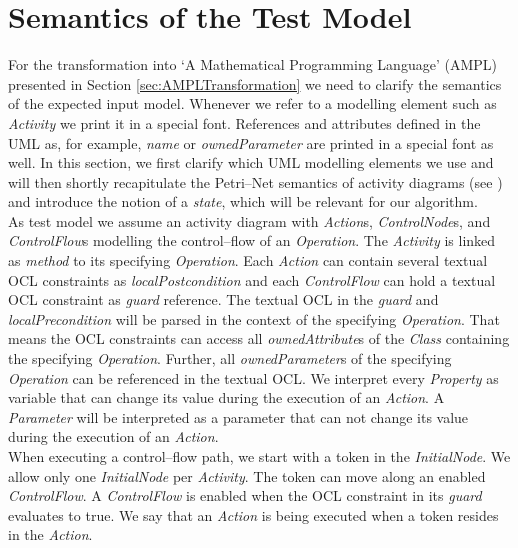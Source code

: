 \documentclass[runningheads,a4paper]{llncs}%
\newcommand{\UMLType}[1]{\textsf{\textit{#1}}} %
\newcommand{\UMLReference}[1]{\textsf{\textit{#1}}} %
\begin{document}
\section{Semantics of the Test Model}%
\label{sec:TestModel}%
For the transformation into `A Mathematical Programming Language' (AMPL) presented in Section \ref{sec:AMPLTransformation} we need to clarify the semantics of the expected input model. Whenever we refer to a modelling element such as \UMLType{Activity} we print it in a special font. References and attributes defined in the UML as, for example, \UMLReference{name} or \UMLReference{ownedParameter} are printed in a special font as well. In this section, we first clarify which UML modelling elements we use and will then shortly recapitulate the Petri--Net semantics of activity diagrams (see \cite{UML23Superstructure}) and introduce the notion of a \emph{state}, which will be relevant for our algorithm.\\%
As test model we assume an activity diagram with \UMLType{Action}s, \UMLType{ControlNode}s, and \UMLType{ControlFlow}s modelling the control--flow of an \UMLType{Operation}. The \UMLType{Activity} is linked as \UMLReference{method} to its specifying \UMLType{Operation}. Each \UMLType{Action} can contain several %
textual OCL constraints as \UMLReference{localPostcondition} and each \UMLType{ControlFlow} can hold a textual OCL constraint as %
\UMLReference{guard} reference. The textual OCL in the \UMLReference{guard} and \UMLReference{localPrecondition} will be parsed in the context of the specifying \UMLType{Operation}. That means the OCL constraints can access all \UMLReference{ownedAttribute}s %
of the \UMLType{Class} containing the specifying \UMLType{Operation}. Further, all \UMLReference{ownedParameter}s of the specifying \UMLType{Operation} can be referenced in the textual OCL. We interpret every \UMLType{Property} as variable that can change its value during the execution of an \UMLType{Action}. A \UMLType{Parameter} will be interpreted as a parameter that can not change its value during the execution of an \UMLType{Action}.\\%
When executing a control--flow path, we start with a token in the \UMLType{InitialNode}. We allow only one \UMLType{InitialNode} per \UMLType{Activity}. The token can move along an enabled \UMLType{ControlFlow}. A \UMLType{ControlFlow} is enabled when the OCL constraint in its \UMLReference{guard} evaluates to true. We say that an \UMLType{Action} is being executed when a token resides in the \UMLType{Action}.\\
\end{document}
